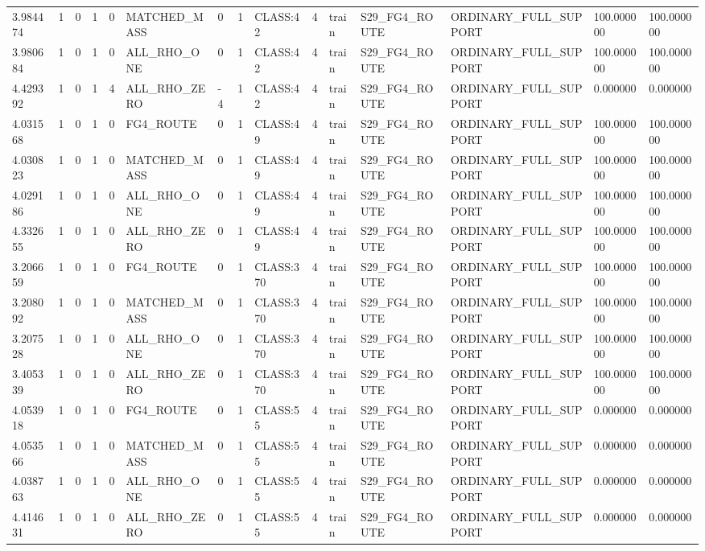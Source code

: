 \begin{tabular}{lllllllllllllll}
3.984474 & 1 & 0 & 1 & 0 & MATCHED\_MASS & 0 & 1 & CLASS:42 & 4 & train & S29\_FG4\_ROUTE & ORDINARY\_FULL\_SUPPORT & 100.000000 & 100.000000 \\
3.980684 & 1 & 0 & 1 & 0 & ALL\_RHO\_ONE & 0 & 1 & CLASS:42 & 4 & train & S29\_FG4\_ROUTE & ORDINARY\_FULL\_SUPPORT & 100.000000 & 100.000000 \\
4.429392 & 1 & 0 & 1 & 4 & ALL\_RHO\_ZERO & -4 & 1 & CLASS:42 & 4 & train & S29\_FG4\_ROUTE & ORDINARY\_FULL\_SUPPORT & 0.000000 & 0.000000 \\
4.031568 & 1 & 0 & 1 & 0 & FG4\_ROUTE & 0 & 1 & CLASS:49 & 4 & train & S29\_FG4\_ROUTE & ORDINARY\_FULL\_SUPPORT & 100.000000 & 100.000000 \\
4.030823 & 1 & 0 & 1 & 0 & MATCHED\_MASS & 0 & 1 & CLASS:49 & 4 & train & S29\_FG4\_ROUTE & ORDINARY\_FULL\_SUPPORT & 100.000000 & 100.000000 \\
4.029186 & 1 & 0 & 1 & 0 & ALL\_RHO\_ONE & 0 & 1 & CLASS:49 & 4 & train & S29\_FG4\_ROUTE & ORDINARY\_FULL\_SUPPORT & 100.000000 & 100.000000 \\
4.332655 & 1 & 0 & 1 & 0 & ALL\_RHO\_ZERO & 0 & 1 & CLASS:49 & 4 & train & S29\_FG4\_ROUTE & ORDINARY\_FULL\_SUPPORT & 100.000000 & 100.000000 \\
3.206659 & 1 & 0 & 1 & 0 & FG4\_ROUTE & 0 & 1 & CLASS:370 & 4 & train & S29\_FG4\_ROUTE & ORDINARY\_FULL\_SUPPORT & 100.000000 & 100.000000 \\
3.208092 & 1 & 0 & 1 & 0 & MATCHED\_MASS & 0 & 1 & CLASS:370 & 4 & train & S29\_FG4\_ROUTE & ORDINARY\_FULL\_SUPPORT & 100.000000 & 100.000000 \\
3.207528 & 1 & 0 & 1 & 0 & ALL\_RHO\_ONE & 0 & 1 & CLASS:370 & 4 & train & S29\_FG4\_ROUTE & ORDINARY\_FULL\_SUPPORT & 100.000000 & 100.000000 \\
3.405339 & 1 & 0 & 1 & 0 & ALL\_RHO\_ZERO & 0 & 1 & CLASS:370 & 4 & train & S29\_FG4\_ROUTE & ORDINARY\_FULL\_SUPPORT & 100.000000 & 100.000000 \\
4.053918 & 1 & 0 & 1 & 0 & FG4\_ROUTE & 0 & 1 & CLASS:55 & 4 & train & S29\_FG4\_ROUTE & ORDINARY\_FULL\_SUPPORT & 0.000000 & 0.000000 \\
4.053566 & 1 & 0 & 1 & 0 & MATCHED\_MASS & 0 & 1 & CLASS:55 & 4 & train & S29\_FG4\_ROUTE & ORDINARY\_FULL\_SUPPORT & 0.000000 & 0.000000 \\
4.038763 & 1 & 0 & 1 & 0 & ALL\_RHO\_ONE & 0 & 1 & CLASS:55 & 4 & train & S29\_FG4\_ROUTE & ORDINARY\_FULL\_SUPPORT & 0.000000 & 0.000000 \\
4.414631 & 1 & 0 & 1 & 0 & ALL\_RHO\_ZERO & 0 & 1 & CLASS:55 & 4 & train & S29\_FG4\_ROUTE & ORDINARY\_FULL\_SUPPORT & 0.000000 & 0.000000 \\

\end{tabular}
